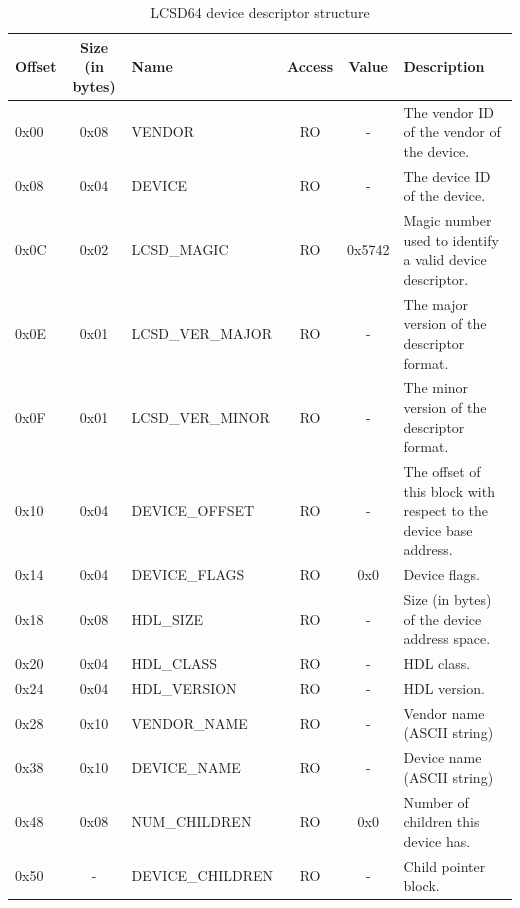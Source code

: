 \documentclass[a4paper, 12pt]{article}
\begin{document}
\begin{center}
	\begin{savenotes}
	\begin{table}[!ht]\footnotesize
	\caption{LCSD64 device descriptor structure}\label{dev_desc_struct}\centering
	\begin{tabular}{| l | c | l | c | c | p{5cm} |} \hline
	Offset & Size (in bytes) & Name & Access & Value & Description \\ \hline
	0x00 & 0x08 & VENDOR & RO & - & The vendor ID of the vendor of the device. \\ \hline
	0x08 & 0x04 & DEVICE & RO & - & The device ID of the device. \\ \hline
	0x0C & 0x02 & LCSD\_MAGIC & RO & 0x5742 & Magic number used to identify a valid device descriptor. \\ \hline
	0x0E & 0x01 & LCSD\_VER\_MAJOR & RO & - & The major version of the descriptor format. \\ \hline
	0x0F & 0x01 & LCSD\_VER\_MINOR & RO & - & The minor version of the descriptor format. \\ \hline
	0x10 & 0x04 & DEVICE\_OFFSET & RO & - & The offset of this block with respect to the device base address. \\ \hline
	0x14 & 0x04 & DEVICE\_FLAGS & RO & 0x0 & Device flags. \\ \hline
	0x18 & 0x08 & HDL\_SIZE & RO & - & Size (in bytes) of the device address space. \\ \hline
	0x20 & 0x04 & HDL\_CLASS & RO & - & HDL class. \\ \hline
	0x24 & 0x04 & HDL\_VERSION & RO & - & HDL version. \\ \hline
	0x28 & 0x10 & VENDOR\_NAME & RO & - & Vendor name (ASCII string) \\ \hline
	0x38 & 0x10 & DEVICE\_NAME & RO & - & Device name (ASCII string) \\ \hline
	0x48 & 0x08 & NUM\_CHILDREN & RO & 0x0 & Number of children this device has. \\ \hline
	0x50 & - & DEVICE\_CHILDREN & RO & - & Child pointer block. \\ \hline
	\end{tabular}
	\end{table}
	\end{savenotes}
\end{center}
\end{document}
